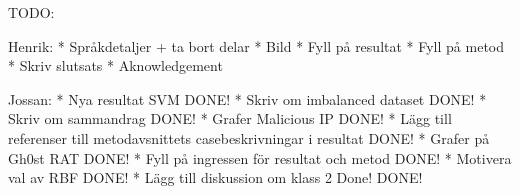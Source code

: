 TODO:

Henrik:
* Språkdetaljer + ta bort delar
* Bild
* Fyll på resultat
* Fyll på metod
* Skriv slutsats
* Aknowledgement

Jossan:
* Nya resultat SVM  DONE!
* Skriv om imbalanced dataset DONE!
* Skriv om sammandrag DONE!
* Grafer Malicious IP DONE!
* Lägg till referenser till metodavsnittets casebeskrivningar i resultat DONE!
* Grafer på Gh0st RAT DONE!
* Fyll på ingressen för resultat och metod DONE!
* Motivera val av RBF DONE!
* Lägg till diskussion om klass 2 Done! DONE!

